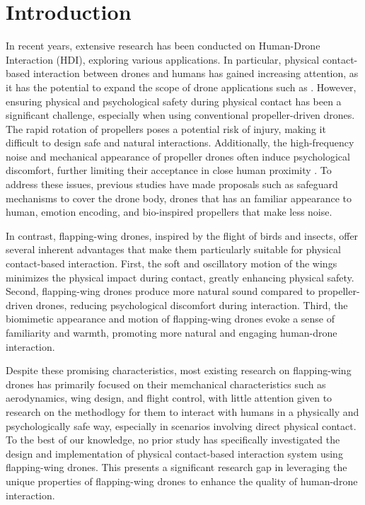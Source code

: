 \section{Introduction}
In recent years, extensive research has been conducted on Human-Drone Interaction (HDI), exploring various applications. 
In particular, physical contact-based interaction between drones and humans has gained increasing attention, as it has the potential to expand the scope of drone applications such as \cite{Knierim2017virtual-reality-tactile-drones, Nitta2014hoverball}. 
However, ensuring physical and psychological safety during physical contact has been a significant challenge, especially when using conventional propeller-driven drones.  
The rapid rotation of propellers poses a potential risk of injury, making it difficult to design safe and natural interactions. 
Additionally, the high-frequency noise and mechanical appearance of propeller drones often induce psychological discomfort, further limiting their acceptance in close human proximity\cite{schaffer2021drone-noise-impact,Yeh2017Proxemics} .
To address these issues, previous studies have made proposals such as 
safeguard mechanisms to cover the drone body\cite{Yeh2017Proxemics, Atahi2017touch-based}, 
drones that has an familiar appearance to human\cite{Yeh2017Proxemics}, 
emotion encoding\cite{Cauchard2016emotion-encoding}, 
and bio-inspired propellers that make less noise\cite{noda2018development-of-low-noise-propeller}.

In contrast, flapping-wing drones, inspired by the flight of birds and insects, offer several inherent advantages that make them particularly suitable for physical contact-based interaction\cite{de2020flapping}.  
First, the soft and oscillatory motion of the wings minimizes the physical impact during contact, greatly enhancing physical safety.  
Second, flapping-wing drones produce more natural sound compared to propeller-driven drones, reducing psychological discomfort during interaction.  
Third, the biomimetic appearance and motion of flapping-wing drones evoke a sense of familiarity and warmth, promoting more natural and engaging human-drone interaction.  

Despite these promising characteristics, most existing research on flapping-wing drones has primarily focused on their memchanical characteristics such as aerodynamics, wing design, and flight control\cite{billingsley2021aerodynamic,rifai2008flapping-control,chin2020efficient-flapping}, 
with little attention given to research on the methodlogy for them to interact with humans in a physically and psychologically safe way, especially in scenarios involving direct physical contact.  
To the best of our knowledge, no prior study has specifically investigated the design and implementation of physical contact-based interaction system using flapping-wing drones.  
This presents a significant research gap in leveraging the unique properties of flapping-wing drones to enhance the quality of human-drone interaction.  

